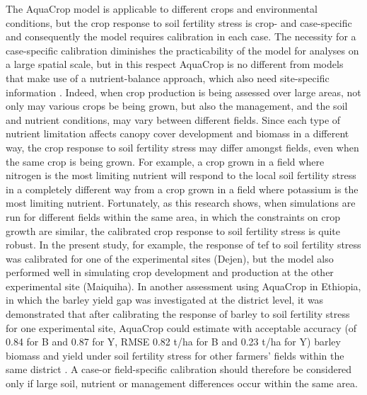 The AquaCrop model is applicable to different crops and environmental conditions, but the crop response to soil fertility stress is crop- and case-specific and consequently the model requires calibration in each case. The necessity for a case-specific calibration diminishes the practicability of the model for analyses on a large spatial scale, but in this respect AquaCrop is no different from models that make use of a nutrient-balance approach, which also need site-specific information \parencite{gabrielle2002, matthews2002c}. Indeed, when crop production is being assessed over large areas, not only may various crops be being grown, but also the management, and the soil and nutrient conditions, may vary between different fields. Since each type of nutrient limitation affects canopy cover development and biomass in a different way, the crop response to soil fertility stress may differ amongst fields, even when the same crop is being grown. For example, a crop grown in a field where nitrogen is the most limiting nutrient will respond to the local soil fertility stress in a completely different way from a crop grown in a field where potassium is the most limiting nutrient. 
Fortunately, as this research shows, when simulations are run for different fields within the same area, in which the constraints on crop growth are similar, the calibrated crop response to soil fertility stress is quite robust. In the present study, for example, the response of tef to soil fertility stress was calibrated for one of the experimental sites (Dejen), but the model also performed well in simulating crop development and production at the other experimental site (Maiquiha). In another assessment using AquaCrop in Ethiopia, in which the barley yield gap was investigated at the district level, it was demonstrated that after calibrating the response of barley to soil fertility stress for one experimental site, AquaCrop could estimate with acceptable accuracy (\Rsq of 0.84 for B and 0.87 for Y, RMSE 0.82 t/ha for B and 0.23 t/ha for Y) barley biomass and yield under soil fertility stress for other farmers' fields within the same district \parencite{abrha2013}. A case-or field-specific calibration should therefore be considered only if large soil, nutrient or management differences occur within the same area. 

